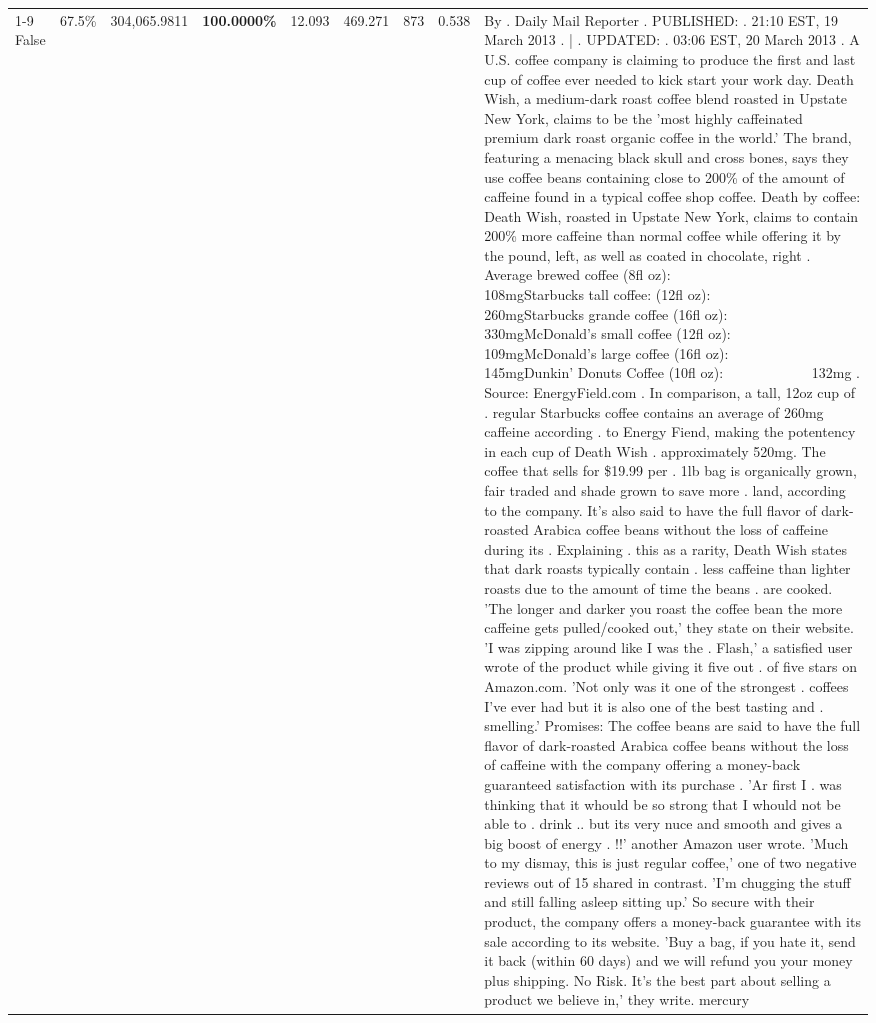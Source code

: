 \begin{table}[H]
{\begin{tabular}{lllrlllll}
\cline{1-9}
False & 67.5\% & 304,065.9811 & \bfseries \color{red} 100.0000\% & 12.093 & 469.271 & 873 & 0.538 & By . Daily Mail Reporter . PUBLISHED: . 21:10 EST, 19 March 2013 . | . UPDATED: . 03:06 EST, 20 March 2013 . A U.S. coffee company is claiming to produce the first and last cup of coffee ever needed to kick start your work day. Death Wish, a medium-dark roast coffee blend roasted in Upstate New York, claims to be the 'most highly caffeinated premium dark roast organic coffee in the world.' The brand, featuring a menacing black skull and cross bones, says they use coffee beans containing close to 200\% of the amount of caffeine found in a typical coffee shop coffee. Death by coffee: Death Wish, roasted in Upstate New York, claims to contain 200\% more caffeine than normal coffee while offering it by the pound, left, as well as coated in chocolate, right . Average brewed coffee (8fl oz):              108mgStarbucks tall coffee: (12fl oz):                260mgStarbucks grande coffee (16fl oz):         330mgMcDonald's small coffee (12fl oz):           109mgMcDonald's large coffee (16fl oz):           145mgDunkin' Donuts Coffee (10fl oz):             132mg . Source: EnergyField.com . In comparison, a tall, 12oz cup of . regular Starbucks coffee contains an average of 260mg caffeine according . to Energy Fiend, making the potentency in each cup of Death Wish . approximately 520mg. The coffee that sells for \$19.99 per . 1lb bag is organically grown, fair traded and shade grown to save more . land, according to the company. It's also said to have the full flavor of dark-roasted Arabica coffee beans without the loss of caffeine during its . Explaining . this as a rarity, Death Wish states that dark roasts typically contain . less caffeine than lighter roasts due to the amount of time the beans . are cooked. 'The longer and darker you roast the coffee bean the more caffeine gets pulled/cooked out,' they state on their website. 'I was zipping around like I was the . Flash,' a satisfied user wrote of the product while giving it five out . of five stars on Amazon.com. 'Not only was it one of the strongest . coffees I've ever had but it is also one of the best tasting and . smelling.’ Promises: The coffee beans are said to have the full flavor of dark-roasted Arabica coffee beans without the loss of caffeine with the company offering a money-back guaranteed satisfaction with its purchase . 'Ar first I . was thinking that it whould be so strong that I whould not be able to . drink .. but its very nuce and smooth and gives a big boost of energy . !!' another Amazon user wrote. 'Much to my dismay, this is just regular coffee,' one of two negative reviews out of 15 shared in contrast. 'I'm chugging the stuff and still falling asleep sitting up.' So secure with their product, the company offers a money-back guarantee with its sale according to its website. 'Buy a bag, if you hate it, send it back (within 60 days) and we will refund you your money plus shipping. No Risk. It’s the best part about selling a product we believe in,' they write. mercury \\

\end{tabular}}
\end{table}
